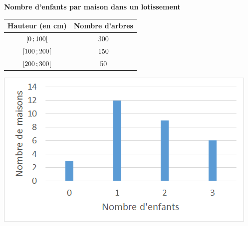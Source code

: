 
\begin{myex}
	
	\textbf{Nombre d'enfants par maison dans un lotissement}
	
	\begin{multicols*}{2}
		
		\begin{center}
			\begin{tabular}{|@{\ }c@{\ }|@{\ }c@{\ }|}
				\hline
				Hauteur (en cm) & Nombre d'arbres \\ \hline
				$\mbox{\ensuremath{\left[0\mathpunct{};100\right[}}$ & 300  \\ \hline
				$\mbox{\ensuremath{\left[100\mathpunct{};200\right[}}$ & 150 \\ \hline
				$\mbox{\ensuremath{\left[200\mathpunct{};300\right[}}$ & 50 \\ \hline
			\end{tabular}
		\end{center}
		
		
		\includegraphics[scale=0.8]{img/barres}
	\end{multicols*}
	
\end{myex}

